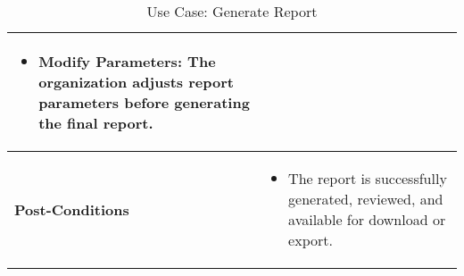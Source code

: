 \begin{table}[!ht]
\begin{tabularx}{\textwidth}{|l|X|}
        \begin{itemize}[label=--,itemsep=0pt]
            \item Modify Parameters: The organization adjusts report parameters before generating the final report.
        \end{itemize} \\
        \hline
        \textbf{Post-Conditions} & 
        \begin{itemize}[label=--,itemsep=0pt]
            \item The report is successfully generated, reviewed, and available for download or export.
        \end{itemize} \\
        \hline
    \end{tabularx}
    \caption{Use Case: Generate Report}
    \label{tab:use-case-generate-report}
\end{table}


